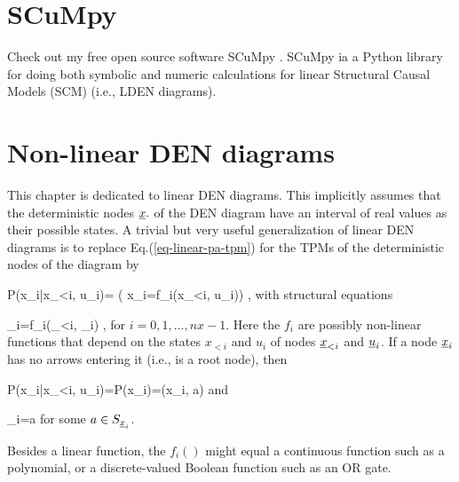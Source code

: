 \section{SCuMpy}
Check out my free open source
software SCuMpy \cite{scumpy}.
SCuMpy ia a Python library for doing both symbolic and numeric calculations for linear Structural Causal Models (SCM) (i.e., LDEN diagrams).


\section{Non-linear DEN diagrams}
This chapter 
is dedicated to
linear DEN diagrams. This
implicitly
assumes that 
the deterministic
nodes $\rvx.$
of the 
DEN diagram have
an interval of
real values as their
possible states.
A trivial
but very useful
generalization
of linear DEN diagrams is to
replace Eq.(\ref{eq-linear-pa-tpm})
for the TPMs
of the
deterministic nodes
of the diagram by

\beq\color{blue}
P(x_i|x_{<i}, u_i)=
\indi(
x_i=f_i(x_{<i}, u_i))
\;,
\label{eq-nonlinear-pa-tpm}
\eeq
with structural equations

\beq
\rvx_i=f_i(\rvx_{<i}, \rvu_i)
\;,
\label{eq-pa-nonlinear-struc}
\eeq
for $i=0, 1, \ldots, nx-1$.
Here the $f_i$ are 
possibly non-linear
functions
that depend on
the states
$x_{<i}$ and $u_i$
of nodes $\rvx_{<i}$
and $\rvu_i$.
If a node $\rvx_i$
has no arrows
entering it (i.e., is
a root node), then

\beq\color{blue}
P(x_i|x_{<i}, u_i)=P(x_i)=\delta(x_i, a)
\eeq
and

\beq
\rvx_i=a
\eeq
for some $a\in S_{\rvx_i}$.


Besides a linear function, the
$f_i()$
might equal a
continuous function
such as a polynomial,
or a discrete-valued Boolean
function
such as an OR gate.



